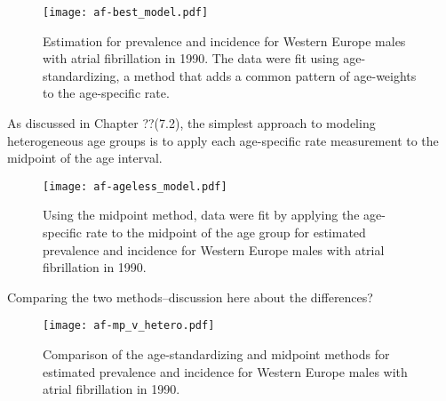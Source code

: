     \begin{figure}[h]
        \begin{center}
            \texttt{[image: af-best\_model.pdf]}
            \caption{Estimation for prevalence and incidence for Western Europe males with atrial fibrillation in 1990.  The data were fit using age-standardizing, a method that adds a common pattern of age-weights to the age-specific rate. }
            \label{fig:app-af age-stand}
        \end{center}
    \end{figure}    
    
As discussed in Chapter ??(7.2), the simplest approach to modeling heterogeneous age groups is to apply each age-specific rate measurement to the midpoint of the age interval.

    \begin{figure}[h]
        \begin{center}
            \texttt{[image: af-ageless\_model.pdf]}
            \caption{Using the midpoint method, data were fit by applying the age-specific rate to the midpoint of the age group for estimated prevalence and incidence for Western Europe males with atrial fibrillation in 1990.}
            \label{fig:app-af mp}
        \end{center}
    \end{figure} 
    
Comparing the two methods--discussion here about the differences?

    \begin{figure}[h]
        \begin{center}
            \texttt{[image: af-mp\_v\_hetero.pdf]}
            \caption{Comparison of the age-standardizing and midpoint methods for estimated prevalence and incidence for Western Europe males with atrial fibrillation in 1990.}
            \label{fig:app-af mp}
        \end{center}
    \end{figure}
        
    
    